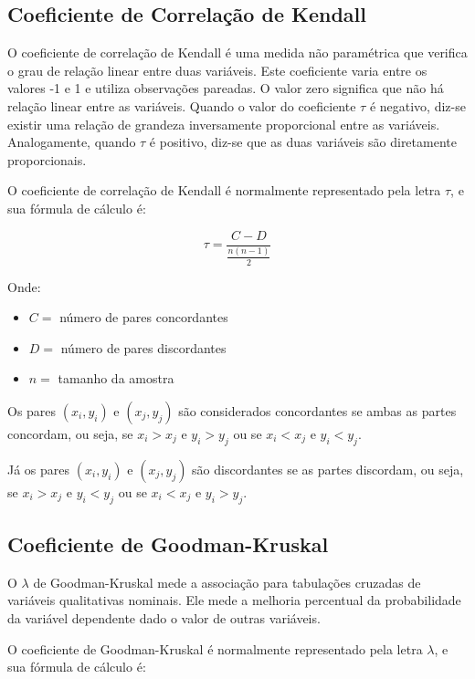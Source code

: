 \documentclass[
]{estat/estat}
\providecommand{\tightlist}{%
  \setlength{\itemsep}{0pt}\setlength{\parskip}{0pt}}\usepackage{longtable,booktabs,array}
\begin{document}
\subsection{Coeficiente de Correlação de
Kendall}\label{coeficiente-de-correlauxe7uxe3o-de-kendall}

O coeficiente de correlação de Kendall é uma medida não paramétrica que
verifica o grau de relação linear entre duas variáveis. Este coeficiente
varia entre os valores -1 e 1 e utiliza observações pareadas. O valor
zero significa que não há relação linear entre as variáveis. Quando o
valor do coeficiente \(\tau\) é negativo, diz-se existir uma relação de
grandeza inversamente proporcional entre as variáveis. Analogamente,
quando \(\tau\) é positivo, diz-se que as duas variáveis são diretamente
proporcionais.

O coeficiente de correlação de Kendall é normalmente representado pela
letra \(\tau\), e sua fórmula de cálculo é:

\[
\tau = \frac{C-D}{\frac{n(n-1)}{2}}
\]

Onde:

\begin{itemize}
\tightlist
\item
  \(C =\) número de pares concordantes
\item
  \(D =\) número de pares discordantes
\item
  \(n =\) tamanho da amostra
\end{itemize}

Os pares \((x_i,y_i)\) e \((x_j,y_j)\) são considerados concordantes se
ambas as partes concordam, ou seja, se \(x_i>x_j\) e \(y_i>y_j\) ou se
\(x_i<x_j\) e \(y_i<y_j\).

Já os pares \((x_i,y_i)\) e \((x_j,y_j)\) são discordantes se as partes
discordam, ou seja, se \(x_i>x_j\) e \(y_i<y_j\) ou se \(x_i<x_j\) e
\(y_i>y_j\).

\subsection{Coeficiente de
Goodman-Kruskal}\label{coeficiente-de-goodman-kruskal}

O \(\lambda\) de Goodman-Kruskal mede a associação para tabulações
cruzadas de variáveis qualitativas nominais. Ele mede a melhoria
percentual da probabilidade da variável dependente dado o valor de
outras variáveis.

O coeficiente de Goodman-Kruskal é normalmente representado pela letra
\(\lambda\), e sua fórmula de cálculo é:
\end{document}
